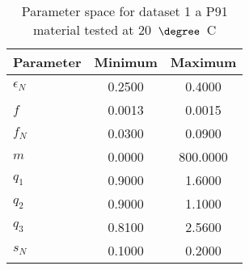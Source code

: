 \begin{table}
\centering
\caption{Parameter space for dataset 1 a P91 material tested at 20~$\degree$~C}
\label{tab:parameter_space_dataset1}
\begin{tabular}{lcc}
\toprule
\textbf{Parameter} & \textbf{Minimum} & \textbf{Maximum}\\
\midrule
\textbf{$\epsilon_N$} &  0.2500 &    0.4000 \\
\textbf{$f$} &  0.0013 &    0.0015 \\
\textbf{$f_N$} &  0.0300 &    0.0900 \\
\textbf{$m$} &  0.0000 &  800.0000 \\
\textbf{$q_1$} &  0.9000 &    1.6000 \\
\textbf{$q_2$} &  0.9000 &    1.1000 \\
\textbf{$q_3$} &  0.8100 &    2.5600 \\
\textbf{$s_N$} &  0.1000 &    0.2000 \\
\bottomrule
\end{tabular}
\end{table}
